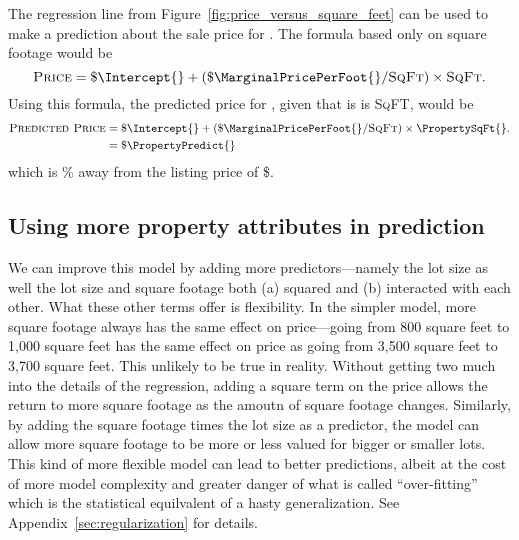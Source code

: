 \documentclass[
12pt, %
letterpaper, %
oneside, %
headinclude,footinclude, %
BCOR5mm, %
]{scrartcl}
\begin{document}
The regression line from Figure~\ref{fig:price_versus_square_feet} can be used to make a prediction about the sale price for \PropertyName{}. 
The formula based only on square footage would be
\begin{equation}
  \textsc{Price} = \$ \Intercept{} + (\$ \MarginalPricePerFoot{}/\textsc{SqFt}) \times \textsc{SqFt}. \nonumber
\end{equation}
Using this formula, the predicted price for \PropertyName{}, given that is is \PropertySqFt{} \textsc{SqFT}, would be
\begin{align}
\textsc{Predicted Price} & = \$ \Intercept{} + (\$ \MarginalPricePerFoot{}/\textsc{SqFt}) \times \PropertySqFt{}. \\ \nonumber
                         & = \$ \PropertyPredict{} \nonumber 
\end{align}
which is \PctDiff{}\% away from the listing price of \$\PropertyPrice{}.



\subsection{Using more property attributes in prediction}
We can improve this model by adding more predictors---namely the lot size as well the lot size and square footage both (a) squared and (b) interacted with each other.
What these other terms offer is flexibility.
In the simpler model, more square footage always has the same effect on price---going from 800 square feet to 1,000 square feet has the same effect on price as going from 3,500 square feet to 3,700 square feet.
This unlikely to be true in reality.
Without getting two much into the details of the regression, adding a square term on the price allows the return to more square footage as the amoutn of square footage changes.
Similarly, by adding the square footage times the lot size as a predictor, the model can allow more square footage to be more or less valued for bigger or smaller lots. 
This kind of more flexible model can lead to better predictions, albeit at the cost of more model complexity and greater danger of what is called ``over-fitting'' which is the statistical equilvalent of a hasty generalization.
See Appendix~\ref{sec:regularization} for details. 
\end{document}
